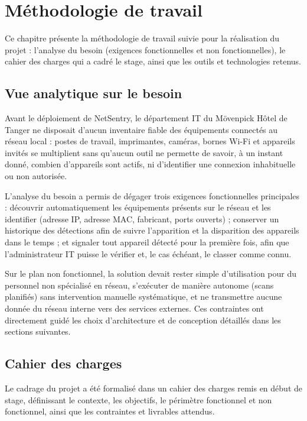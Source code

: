 \chapter{Méthodologie de travail}

Ce chapitre présente la méthodologie de travail suivie pour la réalisation du projet :
l'analyse du besoin (exigences fonctionnelles et non fonctionnelles), le cahier des
charges qui a cadré le stage, ainsi que les outils et technologies retenus.

\section{Vue analytique sur le besoin}

Avant le déploiement de NetSentry, le département IT du Mövenpick Hôtel de Tanger ne
disposait d'aucun inventaire fiable des équipements connectés au réseau local : postes
de travail, imprimantes, caméras, bornes Wi-Fi et appareils invités se multiplient sans
qu'aucun outil ne permette de savoir, à un instant donné, combien d'appareils sont
actifs, ni d'identifier une connexion inhabituelle ou non autorisée.

L'analyse du besoin a permis de dégager trois exigences fonctionnelles principales :
découvrir automatiquement les équipements présents sur le réseau et les identifier
(adresse IP, adresse MAC, fabricant, ports ouverts) ; conserver un historique des
détections afin de suivre l'apparition et la disparition des appareils dans le temps ;
et signaler tout appareil détecté pour la première fois, afin que l'administrateur IT
puisse le vérifier et, le cas échéant, le classer comme connu.

Sur le plan non fonctionnel, la solution devait rester simple d'utilisation pour du
personnel non spécialisé en réseau, s'exécuter de manière autonome (scans planifiés)
sans intervention manuelle systématique, et ne transmettre aucune donnée du réseau
interne vers des services externes. Ces contraintes ont directement guidé les choix
d'architecture et de conception détaillés dans les sections suivantes.

\section{Cahier des charges}

Le cadrage du projet a été formalisé dans un cahier des charges remis en début de
stage, définissant le contexte, les objectifs, le périmètre fonctionnel et non
fonctionnel, ainsi que les contraintes et livrables attendus.

